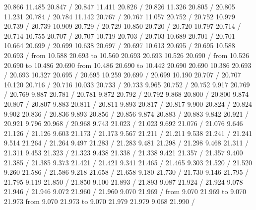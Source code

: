{{ 20.866 11.485 20.847 /
 20.847 11.411 20.826 /
 20.826 11.326 20.805 /
 20.805 11.231 20.784 /
 20.784 11.142 20.767 /
 20.767 11.057 20.752 /
 20.752 10.979 20.739 /
 20.739 10.909 20.729 /
 20.729 10.850 20.720 /
 20.720 10.797 20.714 /
 20.714 10.755 20.707 /
 20.707 10.719 20.703 /
 20.703 10.689 20.701 /
 20.701 10.664 20.699 /
 20.699 10.638 20.697 /
 20.697 10.613 20.695 /
 20.695 10.588 20.693 /
\putrule from 10.588 20.693 to 10.560 20.693
 20.693 10.526 20.690 /
\putrule from 10.526 20.690 to 10.486 20.690
\putrule from 10.486 20.690 to 10.442 20.690
 20.690 10.386 20.693 /
 20.693 10.327 20.695 /
 20.695 10.259 20.699 /
 20.699 10.190 20.707 /
 20.707 10.120 20.716 /
 20.716 10.033 20.733 /
 20.733  9.965 20.752 /
 20.752  9.917 20.769 /
 20.769  9.887 20.781 /
 20.781  9.872 20.792 /
 20.792  9.868 20.800 /
 20.800  9.874 20.807 /
 20.807  9.883 20.811 /
 20.811  9.893 20.817 /
 20.817  9.900 20.824 /
 20.824  9.902 20.836 /
 20.836  9.893 20.856 /
 20.856  9.874 20.883 /
 20.883  9.842 20.921 /
 20.921  9.796 20.968 /
 20.968  9.743 21.023 /
 21.023  9.692 21.076 /
 21.076  9.646 21.126 /
 21.126  9.603 21.173 /
 21.173  9.567 21.211 /
 21.211  9.538 21.241 /
 21.241  9.514 21.264 /
 21.264  9.497 21.283 /
 21.283  9.481 21.298 /
 21.298  9.468 21.311 /
 21.311  9.453 21.323 /
 21.323  9.438 21.338 /
 21.338  9.421 21.357 /
 21.357  9.400 21.385 /
 21.385  9.373 21.421 /
 21.421  9.341 21.465 /
 21.465  9.303 21.520 /
 21.520  9.260 21.586 /
 21.586  9.218 21.658 /
 21.658  9.180 21.730 /
 21.730  9.146 21.795 /
 21.795  9.119 21.850 /
 21.850  9.100 21.893 /
 21.893  9.087 21.924 /
 21.924  9.078 21.946 /
 21.946  9.072 21.960 /
 21.960  9.070 21.969 /
\putrule from  9.070 21.969 to  9.070 21.973
\putrule from  9.070 21.973 to  9.070 21.979
 21.979  9.068 21.990 /
}}
